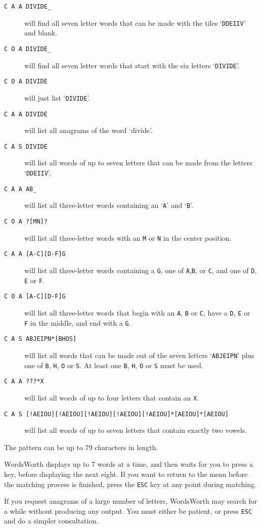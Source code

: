 \begin{description}
\item [{\tt C A A DIVIDE\_}] will find all seven letter words that can be made
with the tiles `{\tt DDEIIV}' and blank.
\item [{\tt C O A DIVIDE\_}] will find all seven letter words that start 
with the six letters `{\tt DIVIDE}'.
\item [{\tt C O A DIVIDE}] will just list `{\tt DIVIDE}'.
\item [{\tt C A A DIVIDE}] will list all anagrams of the word 
`divide'.
\item [{\tt C A S DIVIDE}] will list all words of up to seven letters
that can be made from the letters `{\tt DDEIIV}'.
\item [{\tt C A A AB\_}] will list all three-letter words containing 
an `{\tt A}' and `{\tt B}'.
\item [{\tt C O A ?[MN]?}] will list all three-letter words with an 
{\tt M} or {\tt N} in the center position.
\item [{\tt C A A [A-C][D-F]G}] will list all three-letter words containing
a {\tt G}, one of {\tt A},{\tt B}, or {\tt C}, and one of {\tt D},
{\tt E} or {\tt F}.

\item [{\tt C O A [A-C][D-F]G}] will list all three-letter words that begin
with an {\tt A}, {\tt B} or {\tt C}, have a {\tt D}, {\tt E} or {\tt
F} in the middle, and end with a {\tt G}.
\item [{\tt C A S ABJEIPN*[BHOS]}] will list all words that can be made out
of the seven letters `{\tt ABJEIPN}' plus one of {\tt B}, {\tt H},
{\tt O} or {\tt S}.
At least one {\tt B}, {\tt H}, {\tt O} or {\tt S} must be used.
\item [{\tt C A A ???*X}] will list all words of up to four letters that
contain an {\tt X}.
\item [{\tt C A S [!AEIOU][!AEIOU][!AEIOU][!AEIOU][!AEIOU]*[AEIOU]*[AEIOU]}]
will list all words of up to seven letters that contain exactly two vowels.
\end{description}

The pattern can be up to 79 characters in length.

WordsWorth displays up to 7 words at a time, and then waits for you 
to press a key, before displaying the next eight. If you want to 
return to the menu before the matching process is finished, press
the {\tt ESC} key at any point during matching.

If you request anagrams of a large number of letters, WordsWorth
may search for a while without producing any output. You must
either be patient, or press {\tt ESC} and do a simpler consultation.


